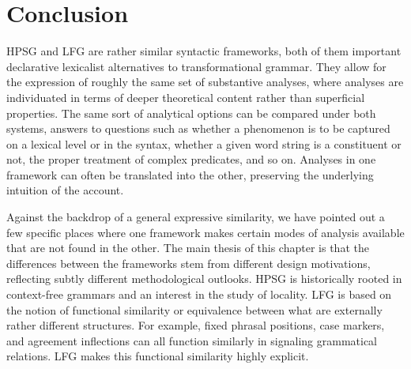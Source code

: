 \section{Conclusion}

HPSG and LFG  are rather similar syntactic frameworks, both of them important declarative lexicalist alternatives to transformational grammar.  They allow for the expression of roughly the same set of substantive analyses, where analyses are individuated in terms of deeper theoretical content rather than superficial properties.  The same sort of analytical options can be compared under both systems, answers to questions such as whether a phenomenon is to be captured on a lexical level or in the syntax, whether a given word string is a constituent or not, the proper treatment of complex predicates, and so on.   Analyses in one framework can often be translated into the other, preserving the underlying intuition of the account.   %

Against the backdrop of a general expressive similarity, we have pointed out a few specific places where one framework makes certain modes of analysis available that are not found in the other.   The main thesis of this chapter is that the differences between the frameworks stem from different design motivations, reflecting subtly different methodological outlooks.  HPSG is historically rooted in context-free grammars and an interest in the study of locality.  LFG is based on the notion of functional similarity or equivalence between what are externally rather different structures. For example, fixed phrasal positions, case markers, and agreement inflections can all function similarly in signaling grammatical relations.  LFG makes this  functional similarity highly explicit.
 

\printbibliography[heading=subbibliography,notkeyword=this] 
%
%
\let\upashtmp\up


